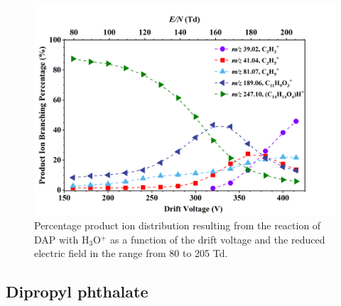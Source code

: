 \begin{figure}[htb]%
\centering
\includegraphics[height=0.4\textheight]{pics/DAP-BR.png}
\caption{Percentage product ion distribution resulting from the reaction of DAP with H$_3$O$^+$ as a function of the drift voltage and the reduced electric field in the range from 80 to 205 Td.}
\label{fig:PH_DAP_fs}
\end{figure}


\subsection{Dipropyl phthalate}


